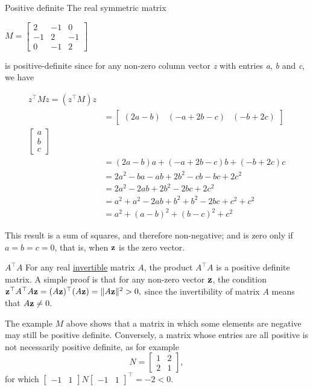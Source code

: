 \begin{example}{Positive definite}{}
 The real symmetric matrix
\begin{description}
\item
\(M = \begin{bmatrix} 2 & -1 & 0 \\ -1 & 2 & -1 \\ 0 & -1 & 2 \end{bmatrix}\)
\end{description}

is positive-definite since for any non-zero column vector \emph{z} with
entries \emph{a}, \emph{b} and \emph{c}, we have

\begin{align}
z^\top  M z=\left(z^\top M\right)z\\
&=\begin{bmatrix}(2a-b)&(-a+2b-c)&(-b+2c)\end{bmatrix}\\
\begin{bmatrix}a\\b\\c\end{bmatrix}\\
&=(2a-b)a+(-a+2b-c)b+(-b+2c)c\\
&=2a^2-ba-ab+2b^2-cb-bc+2c^2\\
&=2a^2-2ab+2b^2-2bc+2c^2\\
&=a^2+a^2-2ab+b^2+b^2-2bc+c^2+c^2\\
&=a^2+(a-b)^2+(b-c)^2+c^2
\end{align}

This result is a sum of squares, and therefore non-negative; and is zero
only if \(a = b = c = 0\), that is, when $\mathbf{z}$ is the zero vector.
\end{example}

\begin{example}{$A^\top A$}{}
For any real \href{Invertible_matrix}{invertible} matrix
\(A\), the product \(A^\top  A\) is a positive definite matrix. A
simple proof is that for any non-zero vector \(\mathbf{z}\), the condition
\(\mathbf{z}^\top  A^\top  A\mathbf{z} = (A\mathbf{z})^\top  (A\mathbf{z}) = \|A\mathbf{z}\|^2 > 0,\)
since the invertibility of matrix \(A\) means that \(A\mathbf{z} \neq 0.\)


The example \(M\) above shows that a matrix in which some
elements are negative may still be positive definite. Conversely, a
matrix whose entries are all positive is not necessarily positive
definite, as for example
\[N = \begin{bmatrix} 1 & 2 \\ 2 & 1 \end{bmatrix},\]
for which
\(\begin{bmatrix} -1 & 1 \end{bmatrix}N\begin{bmatrix} -1 & 1 \end{bmatrix}^\top  = -2 < 0.\)
\end{example}

